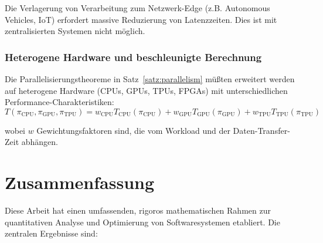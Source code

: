 \documentclass[a4paper,11pt]{article}
\theoremstyle{definition}
\begin{document}
Die Verlagerung von Verarbeitung zum Netzwerk-Edge (z.B. Autonomous Vehicles, IoT) erfordert 
massive Reduzierung von Latenzzeiten. Dies ist mit zentralisierten Systemen nicht möglich.

\subsubsection{Heterogene Hardware und beschleunigte Berechnung}

Die Parallelisierungstheoreme in Satz~\ref{satz:parallelism} müßten erweitert werden auf 
heterogene Hardware (CPUs, GPUs, TPUs, FPGAs) mit unterschiedlichen Performance-Charakteristiken:
\[
    T(\pi_{\text{CPU}}, \pi_{\text{GPU}}, \pi_{\text{TPU}}) = 
    w_{\text{CPU}} T_{\text{CPU}}(\pi_{\text{CPU}}) + 
    w_{\text{GPU}} T_{\text{GPU}}(\pi_{\text{GPU}}) + 
    w_{\text{TPU}} T_{\text{TPU}}(\pi_{\text{TPU}})
\]

wobei $w$ Gewichtungsfaktoren sind, die vom Workload und der Daten-Transfer-Zeit abhängen.

\section{Zusammenfassung}

Diese Arbeit hat einen umfassenden, rigoros mathematischen Rahmen zur quantitativen Analyse 
und Optimierung von Softwaresystemen etabliert. Die zentralen Ergebnisse sind:
\end{document}
